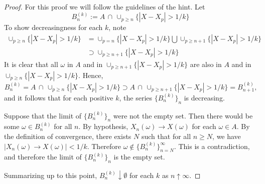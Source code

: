 \documentclass[letterpaper, 12pt]{article}
\begin{document}
\begin{proof}
For this proof we will follow the guidelines of the hint. Let
\[
B_n^{(k)} := A\,\cap\,\cup_{p \geq n} \{|X - X_p| > 1/k\}
\]
To show decreasingness for each $k$, note
\begin{align*}
\cup_{p \geq n} \{|X - X_p| > 1/k\} 
&= \cup_{p = n} \{|X - X_p| > 1/k\} \bigcup \cup_{p \geq n + 1} \{|X - X_p| > 1/k\} \\
& \supset \cup_{p \geq n + 1} \{|X - X_p| > 1/k\}
\end{align*}
It is clear that all $\omega$ in $A$ and in $\cup_{p \geq n + 1} \{|X - X_p| > 1/k\}$ are also in $A$ and in $\cup_{p \geq n} \{|X - X_p| > 1/k\}$. Hence,
\[
B_n^{(k)} = A\,\cap\,\cup_{p \geq n} \{|X - X_p| > 1/k\}
\supset 
A\,\cap\,\cup_{p \geq n + 1}  \{|X - X_p| > 1/k\} = B_{n+1}^{(k)} 
\text{,}
\]
and it follows that for each positive $k$, the series $\{B_n^{(k)}\}_n$ is decreasing.

Suppose that the limit of $\{B_n^{(k)}\}_n$ were not the empty set. 
Then there would be some $\omega \in B_n^{(k)}$ for all $n$.
By hypothesis, $X_n(\omega) \to X(\omega)$ for each $\omega \in A$. 
By the definition of convergence, there exists $N$ such that for all $n \geq N$, we have $|X_n(\omega) \to X(\omega)| < 1/k$. Therefore $\omega \notin \{B_n^{(k)}\}_{n=N}^\infty$. This is a contradiction, and therefore the limit of $\{B_n^{(k)}\}_n$ is the empty set.

Summarizing up to this point, $B_n^{(k)} \downarrow \emptyset$ for each $k$ as $n \uparrow \infty$.


\end{proof}
\end{document}
